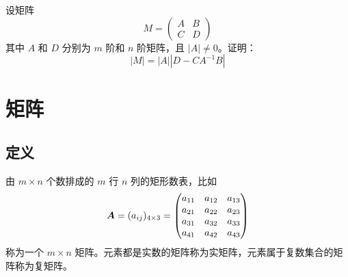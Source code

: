 \documentclass{ctexbook}
\begin{document}
\begin{theorem}[行列式第一降价定理]
    设矩阵
    \begin{equation}
        M=\begin{pmatrix}
            A & B \\ C & D
        \end{pmatrix}
    \end{equation}
    其中 $A$ 和 $D$ 分别为 $m$ 阶和 $n$ 阶矩阵，且 $|A|\neq 0$。证明：
    \begin{equation}
        |M|=|A||D-CA^{-1}B|
    \end{equation}
\end{theorem}

\chapter{矩阵}

\section{定义}

\begin{definition}[矩阵]
    由 $m\times n$ 个数排成的 $m$ 行 $n$ 列的矩形数表，比如
    \begin{equation}
        \boldsymbol{A}=(a_{ij})_{4\times 3}=\mqty(\xmat*{a}{4}{3})
    \end{equation}
    称为一个 $m\times n$ 矩阵。元素都是实数的矩阵称为实矩阵，元素属于复数集合的矩阵称为复矩阵。
\end{definition}
\end{document}
